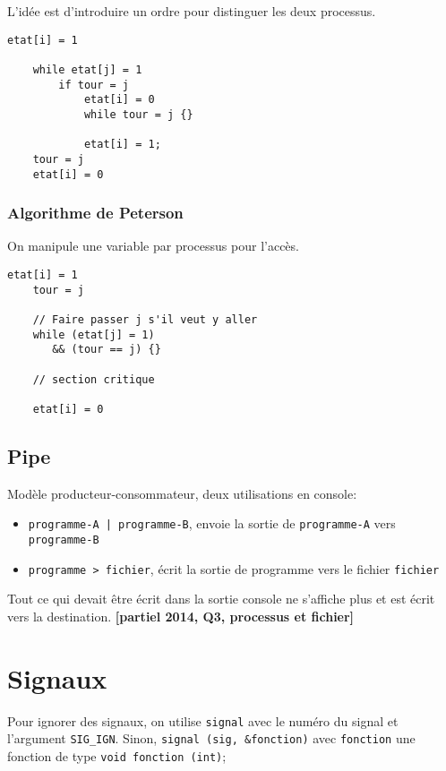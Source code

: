 \documentclass[10pt,twocolumn,a4paper]{article}
\begin{document}
L'idée est d'introduire un ordre pour distinguer les deux processus.
\begin{lstlisting}[frame=shadowbox,xrightmargin=1cm]
    etat[i] = 1
    
    while etat[j] = 1
        if tour = j
            etat[i] = 0
            while tour = j {}
            
            etat[i] = 1;
    tour = j
    etat[i] = 0
\end{lstlisting}

\subsubsection{Algorithme de Peterson}

On manipule une variable par processus pour l'accès.
\begin{lstlisting}[frame=shadowbox,xrightmargin=1cm]
    etat[i] = 1
    tour = j

    // Faire passer j s'il veut y aller
    while (etat[j] = 1) 
       && (tour == j) {} 

    // section critique

    etat[i] = 0
\end{lstlisting}

\subsection{Pipe}

Modèle producteur-consommateur, deux utilisations en console:
\begin{itemize}
    \item \texttt{programme-A | programme-B}, envoie la sortie de \texttt{programme-A} vers \texttt{programme-B}
    \item \texttt{programme > fichier}, écrit la sortie de programme vers le fichier \texttt{fichier}
\end{itemize}

Tout ce qui devait être écrit dans la sortie console ne s'affiche plus et est écrit vers la destination. \textbf{[partiel 2014, Q3, processus et fichier]}



\section{Signaux}

Pour ignorer des signaux, on utilise \texttt{signal} avec le numéro du signal et l'argument \texttt{SIG\_IGN}. Sinon, \texttt{signal (sig, \&fonction)} avec \texttt{fonction} une fonction de type \texttt{void fonction (int)};
\end{document}

